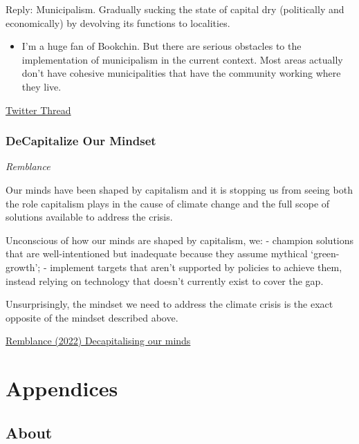\documentclass[
]{book}
\providecommand{\tightlist}{%
  \setlength{\itemsep}{0pt}\setlength{\parskip}{0pt}}
\begin{document}
Reply: Municipalism.
Gradually sucking the state of capital dry (politically and economically) by devolving its
functions to localities.

\begin{itemize}
\tightlist
\item
  I'm a huge fan of Bookchin.
  But there are serious obstacles to the implementation of municipalism in the current context. Most areas actually don't have cohesive municipalities that have the community working where they live.
\end{itemize}

\href{https://twitter.com/bookcheekite/status/1460860305270001665}{Twitter Thread}

\hypertarget{decapitalize-our-mindset}{%
\section{DeCapitalize Our Mindset}\label{decapitalize-our-mindset}}

\emph{Remblance}

Our minds have been shaped by capitalism and it is stopping us from seeing both the role capitalism plays in the cause of climate change and the full scope of solutions available to address the crisis.

Unconscious of how our minds are shaped by capitalism, we:
- champion solutions that are well-intentioned but inadequate because they assume mythical `green-growth';
- implement targets that aren't supported by policies to achieve them, instead relying on technology that doesn't currently exist to cover the gap.

Unsurprisingly, the mindset we need to address the climate crisis is the exact opposite of the mindset described above.

\href{https://illuminem.com/energyvoices/3917163d-b16b-40e0-a63d-44e4b6bb4094}{Remblance (2022) Decapitalising our minds}

\hypertarget{part-appendices}{%
\part{Appendices}\label{part-appendices}}

\hypertarget{appendix-appendices}{%
\appendix}


\hypertarget{about}{%
\chapter{About}\label{about}}
\end{document}
